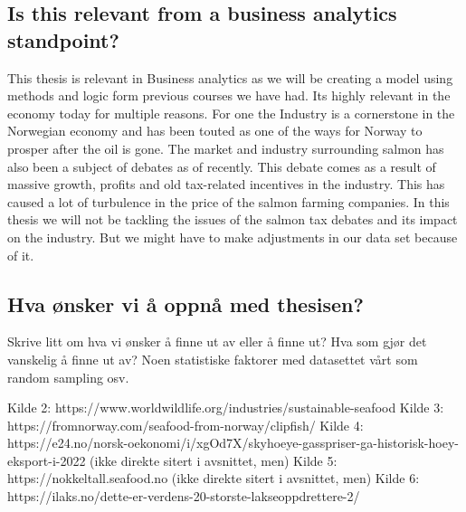 \subsection{Is this relevant from a business analytics standpoint?}
This thesis is relevant in Business analytics as we will be creating a model using methods and logic form previous courses we have had. Its highly relevant in the economy today for multiple reasons. For one the Industry is a cornerstone in the Norwegian economy and has been touted as one of the ways for Norway to prosper after the oil is gone. The market and industry surrounding salmon has also been a subject of debates as of recently. This debate comes as a result of massive growth, profits and old tax-related incentives in the industry. This has caused a lot of turbulence in the price of the salmon farming companies. In this thesis we will not be tackling the issues of the salmon tax debates and its impact on the industry. But we might have to make adjustments in our data set because of it.

\subsection{Hva ønsker vi å oppnå med thesisen?}
Skrive litt om hva vi ønsker å finne ut av eller å finne ut?
Hva som gjør det vanskelig å finne ut av?
Noen statistiske faktorer med datasettet vårt som random sampling osv.


Kilde 2: https://www.worldwildlife.org/industries/sustainable-seafood
Kilde 3: https://fromnorway.com/seafood-from-norway/clipfish/
Kilde 4: https://e24.no/norsk-oekonomi/i/xgOd7X/skyhoeye-gasspriser-ga-historisk-hoey-eksport-i-2022 (ikke direkte sitert i avsnittet, men)
Kilde 5: https://nokkeltall.seafood.no (ikke direkte sitert i avsnittet, men)
Kilde 6: https://ilaks.no/dette-er-verdens-20-storste-lakseoppdrettere-2/